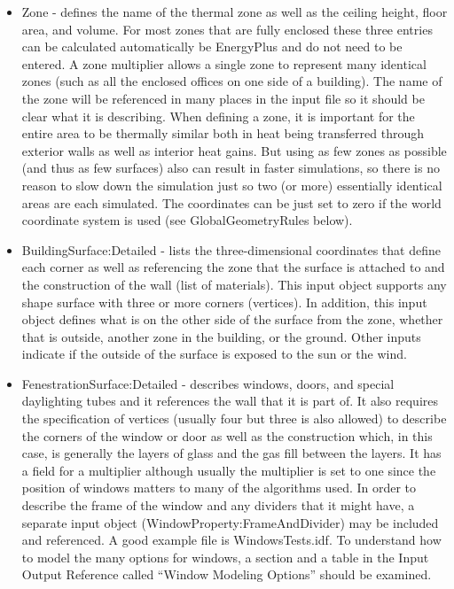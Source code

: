 \begin{itemize}
\item Zone - defines the name of the thermal zone as well as the ceiling
height, floor area, and volume. For most zones that are fully enclosed
these three entries can be calculated automatically be EnergyPlus
and do not need to be entered. A zone multiplier allows a single zone
to represent many identical zones (such as all the enclosed offices
on one side of a building). The name of the zone will be referenced
in many places in the input file so it should be clear what it is
describing. When defining a zone, it is important for the entire area
to be thermally similar both in heat being transferred through exterior
walls as well as interior heat gains. But using as few zones as possible
(and thus as few surfaces) also can result in faster simulations,
so there is no reason to slow down the simulation just so two (or
more) essentially identical areas are each simulated. The coordinates
can be just set to zero if the world coordinate system is used (see
GlobalGeometryRules below).
\item BuildingSurface:Detailed - lists the three-dimensional coordinates
that define each corner as well as referencing the zone that the surface
is attached to and the construction of the wall (list of materials).
This input object supports any shape surface with three or more corners
(vertices). In addition, this input object defines what is on the
other side of the surface from the zone, whether that is outside,
another zone in the building, or the ground. Other inputs indicate
if the outside of the surface is exposed to the sun or the wind.
\item FenestrationSurface:Detailed - describes windows, doors, and special
daylighting tubes and it references the wall that it is part of. It
also requires the specification of vertices (usually four but three
is also allowed) to describe the corners of the window or door as
well as the construction which, in this case, is generally the layers
of glass and the gas fill between the layers. It has a field for a
multiplier although usually the multiplier is set to one since the
position of windows matters to many of the algorithms used. In order
to describe the frame of the window and any dividers that it might
have, a separate input object (WindowProperty:FrameAndDivider) may
be included and referenced. A good example file is WindowsTests.idf.
To understand how to model the many options for windows, a section
and a table in the Input Output Reference called ``Window Modeling
Options'' should be examined.
\end{itemize}

